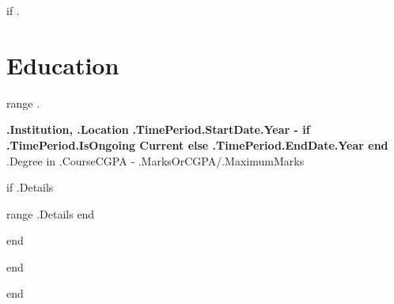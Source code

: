 {{if .}}
    \section{Education}
    \resumeSubHeadingListStart

    {{range .}}
        \resumeSubheading

        {\textbf{ {{.Institution}}, {{.Location}} }}{\textbf{ {{.TimePeriod.StartDate.Year}} - {{if .TimePeriod.IsOngoing}} Current {{else}} {{.TimePeriod.EndDate.Year}} {{end}}} }
        { {{.Degree}} in {{.Course}}}{CGPA - {{.MarksOrCGPA}}/{{.MaximumMarks}} }

        {{if .Details}}
            \resumeItemListStart

            {{range .Details}}
            {{end}}

            \resumeItemListEnd
        {{end}}

        \resumeSubHeadingListEnd
    {{end}}

{{end}}
